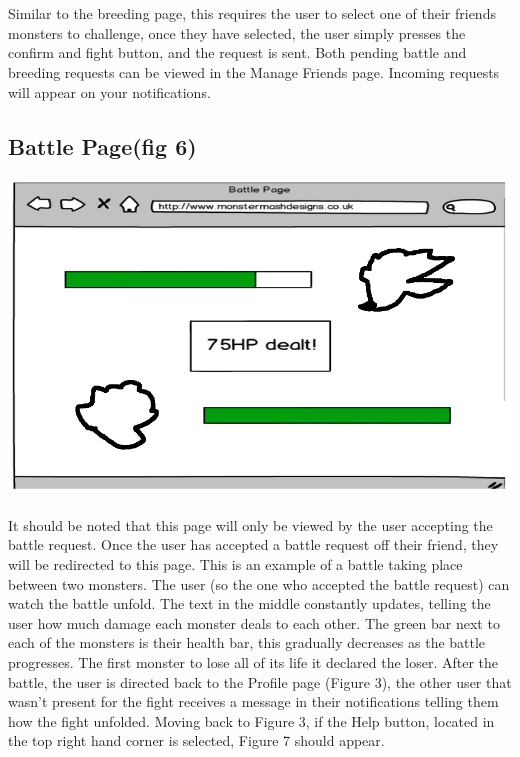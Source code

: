 \documentclass{project}
\begin{document}
\\
\\
Similar to the breeding page, this requires the user to select one of their friends
monsters to challenge, once they have selected, the user simply presses the confirm
and fight button, and the request is sent.
Both pending battle and breeding requests can be viewed in the Manage Friends
page. Incoming requests will appear on your notifications.

\subsection{Battle Page(fig 6)}
\includegraphics[scale=0.5]{battle.jpg}
\\
\\
It should be noted that this page will only be viewed by the user accepting the battle
request. Once the user has accepted a battle request off their friend, they will be
redirected to this page.
This is an example of a battle taking place between two monsters. The user (so
the one who accepted the battle request) can watch the battle unfold. The text
in the middle constantly updates, telling the user how much damage each monster
deals to each other. The green bar next to each of the monsters is their health bar,
this gradually decreases as the battle progresses. The first monster to lose all of its
life it declared the loser. After the battle, the user is directed back to the Profile
page (Figure 3), the other user that wasn't present for the fight receives a message
in their notifications telling them how the fight unfolded.
Moving back to Figure 3, if the Help button, located in the top right hand corner
is selected, Figure 7 should appear.
\end{document}
